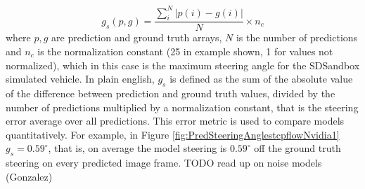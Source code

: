 \begin{equation}
    \label{eq:goodness_of_steer}
    g_s(p,g) = \frac{\sum_i^N \lvert p(i)-g(i) \rvert }{N} \times n_c
\end{equation}
where $p,g$ are prediction and ground truth arrays,  $N$ is the number of predictions and $n_c$ is the normalization constant (25 in example shown, 1 for values not normalized), which in this case is the maximum steering angle for the SDSandbox simulated vehicle. In plain english, $g_s$ is defined as the sum of the absolute value of the difference between prediction and ground truth values, divided by the number of predictions multiplied by a normalization constant, that is the steering error average over all predictions. This error metric is used to compare models quantitatively. For example, in Figure \ref{fig:PredSteeringAnglestcpflowNvidia1} $g_s = 0.59^{\circ}$, that is, on average the model steering is $0.59^{\circ}$ off the ground truth steering on every predicted image frame. 
TODO read up on noise models (Gonzalez)





